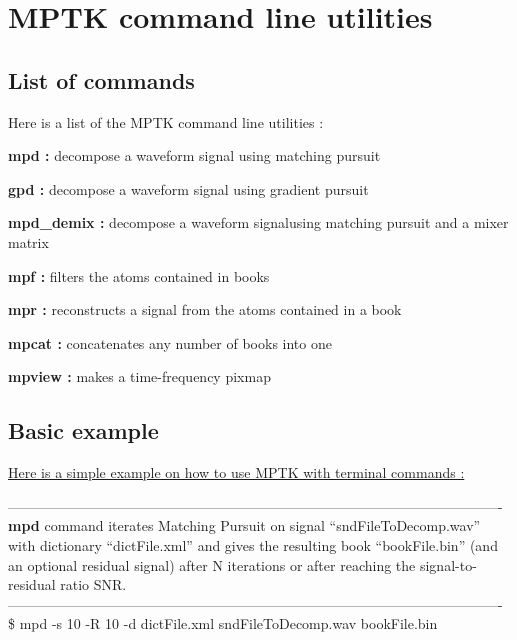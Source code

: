 \chapter{MPTK command line utilities \label{MptkCmdLine}}

\section{List of commands}

Here is a list of the MPTK command line utilities : 
\begin{my_itemize}
	\item \textbf{mpd :} decompose a waveform signal using matching pursuit
	\item \textbf{gpd :} decompose a waveform signal using gradient pursuit
	\item \textbf{mpd\_demix :} decompose a waveform signalusing matching pursuit and a mixer matrix 
	\item \textbf{mpf :} filters the atoms contained in books
	\item \textbf{mpr :} reconstructs a signal from the atoms contained in a book
	\item \textbf{mpcat :} concatenates any number of books into one
	\item \textbf{mpview :} makes a time-frequency pixmap
\end{my_itemize}
	
\section{Basic example}

\underline{Here is a simple example on how to use MPTK with terminal commands :}

\noindent \textcolor[rgb]{0.4,0.4,0.4}{----------------------------------------------------------------------------------------------------------\newline
\textbf{mpd} command iterates Matching Pursuit on signal ``sndFileToDecomp.wav'' with dictionary    
``dictFile.xml'' and gives the resulting book ``bookFile.bin'' (and an optional residual 
signal) after N iterations or after reaching the signal-to-residual ratio SNR.\newline
----------------------------------------------------------------------------------------------------------\newline}
\$ mpd -s 10 -R 10 -d dictFile.xml sndFileToDecomp.wav bookFile.bin

